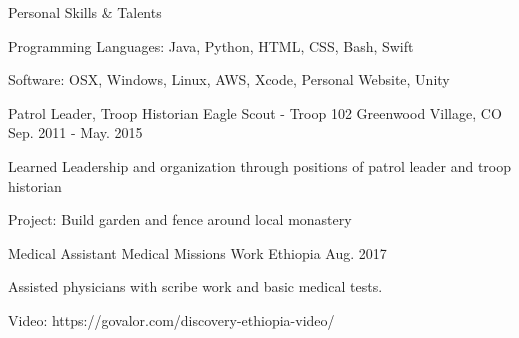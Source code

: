 \vspace{-2.0mm}

\begin{cventries}
  \cventry
    {Personal} %
    {Skills \& Talents} %
    {} %
    {} %
    {
      \begin{cvitems} %
        \item {Programming Languages: Java, Python, HTML, CSS, Bash, Swift}
        \item {Software: OSX, Windows, Linux, AWS, Xcode, Personal Website, Unity}
      \end{cvitems}
    }

  \cventry
    {Patrol Leader, Troop Historian} %
    {Eagle Scout - Troop 102} %
    {Greenwood Village, CO} %
    {Sep. 2011 - May. 2015} %
    {
      \begin{cvitems} %
        \item {Learned Leadership and organization through positions of patrol leader and troop historian}
        \item {Project: Build garden and fence around local monastery }
      \end{cvitems}
    }

\cventry
    {Medical Assistant} %
    {Medical Missions Work} %
    {Ethiopia} %
    {Aug. 2017} %
    {
      \begin{cvitems} %
        \item {Assisted physicians with scribe work and basic medical tests.}
        \item {Video: https://govalor.com/discovery-ethiopia-video/}
      \end{cvitems}
    }

\end{cventries}

